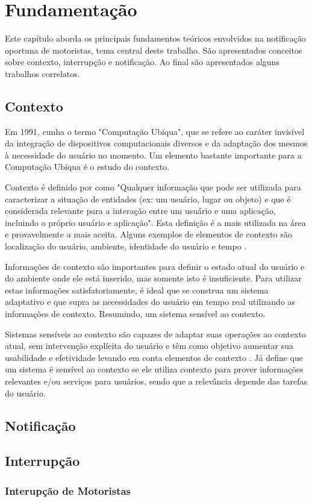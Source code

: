 \chapter{Fundamentação}
\label{fundamentacao}
Este capítulo aborda os principais fundamentos teóricos envolvidos na notificação oportuna de motoristas,
tema central deste trabalho. São apresentados conceitos sobre contexto, interrupção e notificação.
Ao final são apresentados alguns trabalhos correlatos.

\section{Contexto}
\label{contexto}
Em 1991, \cite{weiser1991computer} cunha o termo "Computação Ubíqua", que se refere ao caráter invisível da
integração de dispositivos computacionais diversos e da adaptação dos mesmos à necessidade do usuário no momento.
Um elemento bastante importante para a Computação Ubíqua é o estudo do contexto.

Contexto é definido por \cite{dey2001understanding} como "Qualquer informação que pode ser utilizada para
caracterizar a situação de entidades (ex: um usuário, lugar ou objeto) e que é considerada relevante para
a interação entre um usuário e uma aplicação, incluindo o próprio usuário e aplicação". Esta definição é
a mais utilizada na área e provavelmente a mais aceita. Alguns exemplos de elementos de contexto são
localização do usuário, ambiente, identidade do usuário e tempo \cite{ryan1999enhanced}.

Informações de contexto são importantes para definir o estado atual do usuário e do ambiente onde ele está
inserido, mas somente isto é insuficiente. Para utilizar estas informações satisfatoriamente, é ideal que
se construa um sistema adaptativo e que supra as necessidades do usuário em tempo real utilizando as
informações de contexto. Resumindo, um sistema sensível ao contexto.

Sistemas sensíveis ao contexto são capazes de adaptar suas operações ao contexto atual, sem intervenção
explícita do usuário e têm como objetivo aumentar sua usabilidade e efetividade levando em conta elementos
de contexto \cite{baldauf2007survey}. Já \cite{abowd1999towards} define que um sistema é sensível ao contexto
se ele utiliza contexto para prover informações relevantes e/ou serviços para usuários, sendo que a relevância
depende das tarefas do usuário.



\section{Notificação}
\label{notificacao}

\section{Interrupção}
\label{interrupcao}

\subsection{Interupção de Motoristas}
\label{interrupcao-motoristas}
